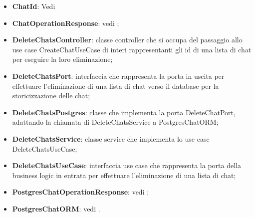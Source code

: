 \documentclass[10pt, a4paper]{article}
\begin{document}
\begin{itemize}
    \item \textbf{ChatId}: Vedi 
    \item \textbf{ChatOperationResponse}: vedi ;
    \item \label{DeleteChatsController}\textbf{DeleteChatsController}: classe controller che si occupa del passaggio allo use case CreateChatUseCase di interi rappresentanti gli id di una lista di chat per eseguire la loro eliminazione;
    \item \label{DeleteChatsPort}\textbf{DeleteChatsPort}: interfaccia che rappresenta la porta in uscita per effettuare l'eliminazione di una lista di chat verso il database per la storicizzazione delle chat;
    \item \label{DeleteChatsPostgres}\textbf{DeleteChatsPostgres}: classe che implementa la porta DeleteChatPort, adattando la chiamata di DeleteChatsService a PostgresChatORM;

    \item \label{DeleteChatsService}\textbf{DeleteChatsService}: classe service che implementa lo use case DeleteChatsUseCase;

    \item \label{DeleteChatsUseCase}\textbf{DeleteChatsUseCase}: interfaccia use case che rappresenta la porta della business logic in entrata per effettuare l'eliminazione di una lista di chat;
    \item \textbf{PostgresChatOperationResponse}: vedi ;
    \item \textbf{PostgresChatORM}: vedi .
\end{itemize}
 
\end{document}
